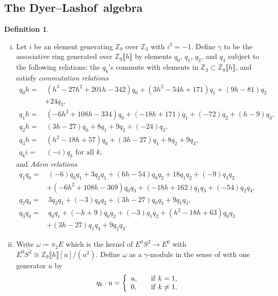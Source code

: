 \documentclass{gtpart}
\theoremstyle{definition}
\newtheorem{defn}[thm]{Definition}
\theoremstyle{remark}
\newcommand{\mb}[1]{\mathbb{#1}}
\newcommand{\DL}{Dyer--Lashof~}
\newcommand{\BZ}{{\mb Z}}
\newcommand{\g}{\gamma}
\begin{document}
\subsection{The \DL algebra}

\begin{defn}
\label{def:go}
 \mbox{}
 \begin{enumerate}[(i)]
  \item \label{go(i)} Let $i$ be an element generating $\BZ_9$ over $\BZ_3$ with $i^2 = -1$.  
  Define $\g$ to be the associative ring generated over $\BZ_9 \llbracket h \rrbracket$ 
  by elements $q_0$, $q_1$, $q_2$, and $q_3$ subject to the following relations: 
  the $q_k$'s commute with elements in $\BZ_3 \subset \BZ_9 \llbracket h \rrbracket$, 
  and satisfy {\em commutation relations} 
  \begin{equation*}
  \begin{split}
   q_0 h = & ~ (h^3 - 27 h^2 + 201 h - 342) q_0 + (3 h^2 - 54 h + 171) q_1 + (9 h - 81) q_2 \\
           & + 24 q_3, \\
   q_1 h = & ~ (-6 h^2 + 108 h - 334) q_0 + (-18 h + 171) q_1 + (-72) q_2 + (h - 9) q_3, \\
   q_2 h = & ~ (3 h - 27) q_0 + 8 q_1 + 9 q_2 + (-24) q_3, \\
   q_3 h = & ~ (h^2 - 18 h + 57) q_0 + (3 h - 27) q_1 + 8 q_2 + 9 q_3, \\
   q_k i = & ~ (-i) q_k \text{~for all~} k, 
  \end{split}
  \end{equation*}
  and {\em Adem relations} 
  \begin{equation*}
  \begin{split}
   q_1q_0 = & ~ (-6) q_0q_1 + 3 q_2q_1 + (6 h - 54) q_0q_2 + 18 q_1q_2 + (-9) q_3q_2 \\
            & + (-6 h^2 + 108 h - 369) q_0q_3 + (-18 h + 162) q_1q_3 + (-54) q_2q_3, \quad~~ \\
   q_2q_0 = & ~ 3 q_3q_1 + (-3) q_0q_2 + (3 h - 27) q_0q_3 + 9 q_1q_3, \\
   q_3q_0 = & ~ q_0q_1 + (-h + 9) q_0q_2 + (-3) q_1q_2 + (h^2 - 18 h + 63) q_0q_3 \\
            & + (3 h - 27) q_1q_3 + 9 q_2q_3.  
  \end{split}
  \end{equation*}

  \item \label{go(ii)} Write $\omega \coloneqq \pi_2 E$ which is the kernel of $E^0 S^2 \to E^0$ with $E^0 S^2 \cong \BZ_9 \llbracket h \rrbracket [u] / (u^2)$.  
  Define $\omega$ as a $\g$-module in the sense of \cite[2.2]{h2p2} with one generator $u$ by 
  \[
   q_k \cdot u = \left\{
   \begin{array}{ll}
     u,  & \quad {\rm if}~k = 1, \\
     0,  & \quad {\rm if}~k \neq 1.  \\
   \end{array}
   \right.
  \]
 \end{enumerate}
\end{defn}
\end{document}
